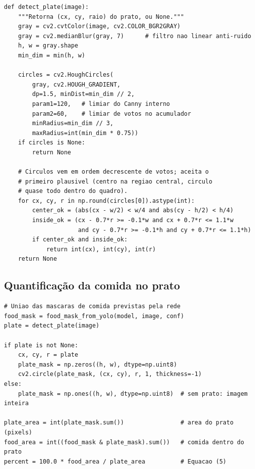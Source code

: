 \documentclass[12pt,a4paper]{article}
\begin{document}
\begin{lstlisting}
def detect_plate(image):
    """Retorna (cx, cy, raio) do prato, ou None."""
    gray = cv2.cvtColor(image, cv2.COLOR_BGR2GRAY)
    gray = cv2.medianBlur(gray, 7)      # filtro nao linear anti-ruido
    h, w = gray.shape
    min_dim = min(h, w)

    circles = cv2.HoughCircles(
        gray, cv2.HOUGH_GRADIENT,
        dp=1.5, minDist=min_dim // 2,
        param1=120,   # limiar do Canny interno
        param2=60,    # limiar de votos no acumulador
        minRadius=min_dim // 3,
        maxRadius=int(min_dim * 0.75))
    if circles is None:
        return None

    # Circulos vem em ordem decrescente de votos; aceita o
    # primeiro plausivel (centro na regiao central, circulo
    # quase todo dentro do quadro).
    for cx, cy, r in np.round(circles[0]).astype(int):
        center_ok = (abs(cx - w/2) < w/4 and abs(cy - h/2) < h/4)
        inside_ok = (cx - 0.7*r >= -0.1*w and cx + 0.7*r <= 1.1*w
                     and cy - 0.7*r >= -0.1*h and cy + 0.7*r <= 1.1*h)
        if center_ok and inside_ok:
            return int(cx), int(cy), int(r)
    return None
\end{lstlisting}

\subsection{Quantificação da comida no prato}

\begin{lstlisting}
# Uniao das mascaras de comida previstas pela rede
food_mask = food_mask_from_yolo(model, image, conf)
plate = detect_plate(image)

if plate is not None:
    cx, cy, r = plate
    plate_mask = np.zeros((h, w), dtype=np.uint8)
    cv2.circle(plate_mask, (cx, cy), r, 1, thickness=-1)
else:
    plate_mask = np.ones((h, w), dtype=np.uint8)  # sem prato: imagem inteira

plate_area = int(plate_mask.sum())                # area do prato (pixels)
food_area = int((food_mask & plate_mask).sum())   # comida dentro do prato
percent = 100.0 * food_area / plate_area          # Equacao (5)
\end{lstlisting}
\end{document}
